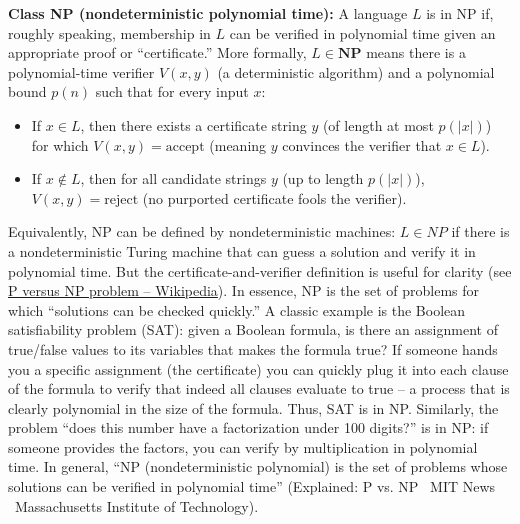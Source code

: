 \documentclass[11pt]{article}
\begin{document}
\textbf{Class NP (nondeterministic polynomial time):} A language \(L\) is in NP if, roughly speaking, membership in \(L\) can be verified in polynomial time given an appropriate proof or “certificate.” More formally, \(L\in \mathbf{NP}\) means there is a polynomial-time verifier \(V(x, y)\) (a deterministic algorithm) and a polynomial bound \(p(n)\) such that for every input \(x\):
\begin{itemize}
    \item If \(x \in L\), then there exists a certificate string \(y\) (of length at most \(p(|x|)\)) for which \(V(x,y) = \text{accept}\) (meaning \(y\) convinces the verifier that \(x \in L\)).
    \item If \(x \notin L\), then for all candidate strings \(y\) (up to length \(p(|x|)\)), \(V(x,y) = \text{reject}\) (no purported certificate fools the verifier).
\end{itemize}
Equivalently, NP can be defined by nondeterministic machines: \(L\in NP\) if there is a nondeterministic Turing machine that can guess a solution and verify it in polynomial time. But the certificate-and-verifier definition is useful for clarity (see \href{https://en.wikipedia.org/wiki/P_versus_NP_problem}{P versus NP problem -- Wikipedia}). In essence, NP is the set of problems for which “solutions can be checked quickly.” A classic example is the Boolean satisfiability problem (SAT): given a Boolean formula, is there an assignment of true/false values to its variables that makes the formula true? If someone hands you a specific assignment (the certificate) you can quickly plug it into each clause of the formula to verify that indeed all clauses evaluate to true -- a process that is clearly polynomial in the size of the formula. Thus, SAT is in NP. Similarly, the problem “does this number have a factorization under 100 digits?” is in NP: if someone provides the factors, you can verify by multiplication in polynomial time. In general, “NP (nondeterministic polynomial) is the set of problems whose solutions can be verified in polynomial time” (Explained: P vs. NP \textbar\ MIT News \textbar\ Massachusetts Institute of Technology).
\end{document}
